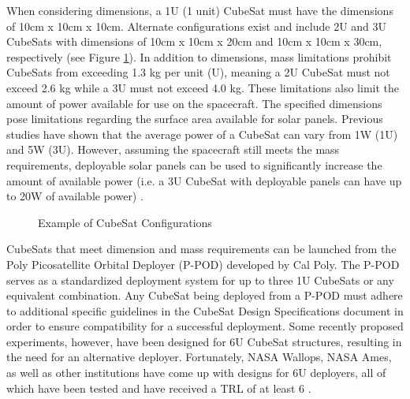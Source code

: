 \documentclass[11pt]{article}
\begin{document}
When considering dimensions, a 1U (1 unit) CubeSat must have the dimensions of 10cm x 10cm x 10cm.  Alternate configurations exist and include 2U and 3U CubeSats with dimensions of 10cm x 10cm x 20cm and 10cm x 10cm x 30cm, respectively (see Figure \ref{config}).  In addition to dimensions, mass limitations prohibit CubeSats from exceeding 1.3 kg per unit (U), meaning a 2U CubeSat must not exceed 2.6 kg while a 3U must not exceed 4.0 kg.  These limitations also limit the amount of power available for use on the spacecraft.  The specified dimensions pose limitations regarding the surface area available for solar panels.  Previous studies have shown that the average power of a CubeSat can vary from 1W (1U) and 5W (3U).  However, assuming the spacecraft still meets the mass requirements, deployable solar panels can be used to significantly increase the amount of available power (i.e. a 3U CubeSat with deployable panels can have up to 20W of available power) \cite{ClydeSpace}. 

\begin{figure}[ht!]
\centering
{}
\caption{Example of CubeSat Configurations\cite{configimage}}
\label{config}
\end{figure}

CubeSats that meet dimension and mass requirements can be launched from the Poly Picosatellite Orbital Deployer (P-POD) developed by Cal Poly.  The P-POD serves as a standardized deployment system for up to three 1U CubeSats or any equivalent combination.  Any CubeSat being deployed from a P-POD must adhere to additional specific guidelines in the CubeSat Design Specifications document in order to ensure compatibility for a successful deployment.  Some recently proposed experiments, however, have been designed for 6U CubeSat structures, resulting in the need for an alternative deployer.  Fortunately, NASA Wallops, NASA Ames, as well as other institutions have come up with designs for 6U deployers, all of which have been tested and have received a TRL of at least 6 \cite{SmSCTech}.
\end{document}
